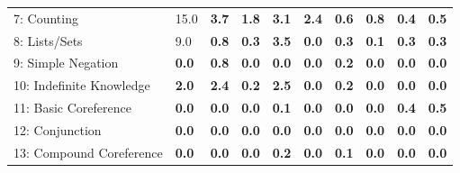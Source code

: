\documentclass[twoside,ms]{snuthesis_utf8}
\begin{document}
\begin{table}[h]
\begin{adjustbox}{max width=0.95\textwidth}
\begin{tabular}{l|llllllll>{\columncolor[gray]{0.8}}l}
7: Counting                          & 15.0                      & \textbf{3.7}                       & \textbf{1.8}                         & \textbf{3.1}                     & \textbf{2.4}                      & \textbf{0.6}                    & \textbf{0.8}                        &\textbf{0.4}                &\textbf{0.5}                    \\
8: Lists/Sets                        & 9.0                       & \textbf{0.8}                        & \textbf{0.3}                         & \textbf{3.5}                     & \textbf{0.0}                     & \textbf{0.3}                     &\textbf{0.1} & \textbf{0.3}                   & \textbf{0.3}                     \\
9: Simple Negation                   & \textbf{0.0}                       & \textbf{0.8}                        & \textbf{0.0}                         & \textbf{0.0 } & \textbf{0.0}                      & \textbf{0.2}                     &\textbf{ 0.0 }                       & \textbf{0.0}                   &\textbf{0.0}                    \\
10: Indefinite Knowledge             & \textbf{2.0}                       & \textbf{2.4}                      & \textbf{0.2} &\textbf{2.5}                     & \textbf{0.0}                      & \textbf{0.2}                     & \textbf{0.0}                        & \textbf{0.0}                    & \textbf{0.0}                   \\
11: Basic Coreference                & \textbf{0.0}                       & \textbf{0.0}                        & \textbf{0.0}                         & \textbf{0.1}                    & \textbf{0.0}                      & \textbf{0.0}                     & \textbf{0.0}                        & \textbf{0.4}                  & \textbf{0.5}                    \\
12: Conjunction                      & \textbf{0.0}                       & \textbf{0.0}                        & \textbf{0.0}                         & \textbf{0.0}                     &\textbf{0.0}                      &\textbf{0.0}                     & \textbf{0.0}                        & \textbf{0.0}                   & \textbf{0.0}                     \\
13: Compound Coreference             & \textbf{0.0}                       & \textbf{0.0}                        & \textbf{0.0} & \textbf{0.2}                     & \textbf{0.0}                      & \textbf{0.1} & \textbf{0.0}                        & \textbf{0.0}                 & \textbf{0.0}                     \\

\end{tabular}
\end{adjustbox}
\end{table}
\end{document}
